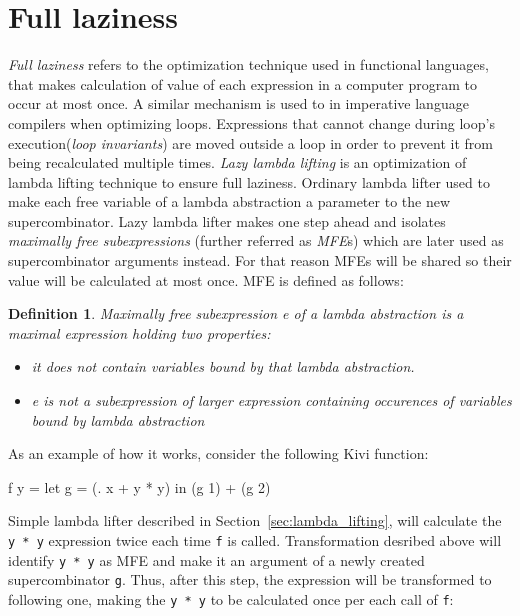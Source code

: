 \documentclass[12pt,a4paper]{report}
\newtheorem{definition}{Definition}[chapter]
\begin{document}
\section{Full laziness}
\textit{Full laziness} refers to the optimization technique used in functional
languages, that makes calculation of value of each expression in a computer
program to occur at most once. A similar mechanism is used to in imperative
language compilers when optimizing loops. Expressions that cannot change during
loop's execution(\textit{loop invariants}) are moved outside a loop in order to
prevent it from being recalculated multiple times.
\textit{Lazy lambda lifting} is an optimization of lambda lifting technique to
ensure full laziness. Ordinary lambda lifter used to make each free variable of
a lambda abstraction a parameter to the new supercombinator. Lazy lambda lifter
makes one step ahead and isolates \textit{maximally free subexpressions}
(further referred as \textit{MFE}s) which are later used as supercombinator
arguments instead. For that reason MFEs will be shared so their value will be
calculated at most once. MFE is defined as follows:

\begin{definition}
  Maximally free subexpression e of a lambda abstraction is a maximal
  expression holding two properties:

  \begin{itemize}
    \item it does not contain variables bound by that lambda abstraction.
    \item e is not a subexpression of larger expression containing occurences of
      variables bound by lambda abstraction
  \end{itemize}
\end{definition}

As an example of how it works, consider the following Kivi function:

\vspace*{0.2in}
\begin{code}[style=haskell]
f y =
    let g = (\x . x + y * y)
    in (g 1) + (g 2)
\end{code}

Simple lambda lifter described in Section~\ref{sec:lambda_lifting}, will
calculate the \texttt{y * y} expression twice each time \texttt{f} is called.
Transformation desribed above will identify \texttt{y * y} as MFE and make it
an argument of a newly created supercombinator \texttt{g}. Thus, after this
step, the expression will be transformed to following one, making the \texttt{y
* y} to be calculated once per each call of \texttt{f}:
\end{document}
